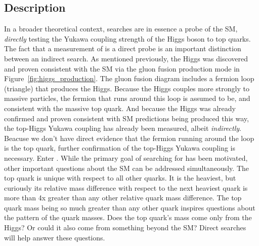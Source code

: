 \subsection{Description}
In a broader theoretical context, \tth searches are in essence a probe of the SM, \emph{directly} testing the Yukawa coupling strength of the Higgs boson to top quarks. The fact that a
measurement of \tth is a direct probe is an important distinction between an indirect search. As mentioned previously, the Higgs was discovered and proven
consistent with the SM via the gluon fusion production mode in Figure~\ref{fig:higgs_production}. The gluon fusion diagram includes a fermion loop (triangle)
that produces the Higgs. Because the Higgs couples more strongly to massive particles, the fermion that runs around this loop is assumed to be, and consistent
with the massive top quark. And
because the Higgs was already confirmed and proven consistent with SM predictions being produced this way, the top-Higgs Yukawa coupling has already been
measured, albeit \emph{indirectly}. Beacuse we don't have direct evidence that the fermion running around the loop is the top quark, further
confirmation of the top-Higgs Yukawa coupling is necessary. Enter \tth. While the primary goal of searching for \tth has been motivated,
other important questions about the SM can be addressed simultaneously. The top quark is unique with respect to all other quarks. It is the heaviest, but curiously
its relative mass difference with respect to the next heaviest quark is more than 4x greater than any other relative quark mass difference. The top quark mass
being so much greater than any other quark inspires questions about the pattern of the quark masses. Does the top quark's mass come only from the Higgs? Or could
it also come from something beyond the SM? Direct \tth searches will help answer these questions. 



